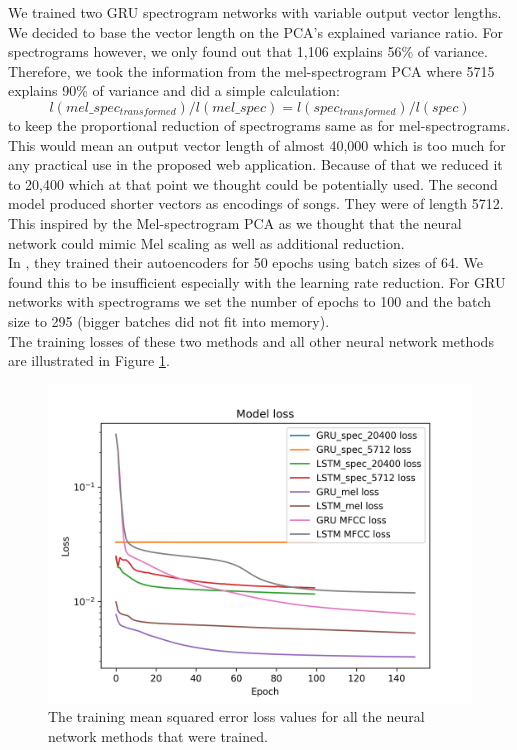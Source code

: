 We trained two GRU spectrogram networks with variable output vector lengths. We decided to base the vector length on the PCA's explained variance ratio. For spectrograms however, we only found out that 1,106 explains 56\% of variance. Therefore, we took the information from the mel-spectrogram PCA where 5715 explains 90\% of variance and did a simple calculation: $$ l(mel\_spec_{transformed})/l(mel\_spec) = l(spec_{transformed})/l(spec) $$ to keep the proportional reduction of spectrograms same as for mel-spectrograms. This would mean an output vector length of almost 40,000 which is too much for any practical use in the proposed web application. Because of that we reduced it to 20,400 which at that point we thought could be potentially used. 
The second model produced shorter vectors as encodings of songs. They were of length 5712. This inspired by the Mel-spectrogram PCA as we thought that the neural network could mimic Mel scaling as well as additional reduction. \\
In \cite{inproceedings_RNNs}, they trained their autoencoders for 50 epochs using batch sizes of 64. We found this to be insufficient especially with the learning rate reduction. For GRU networks with spectrograms we set the number of epochs to 100 and the batch size to 295 (bigger batches did not fit into memory). \\
The training losses of these two methods and all other neural network methods are illustrated in Figure \ref{fig:all_model_training}.

\begin{figure}[h]
    \centering
	\includegraphics[width=120mm]{./img/all_training_graphs.png}
	\caption{The training mean squared error loss values for all the neural network methods that were trained.}
	\label{fig:all_model_training}
\end{figure}


